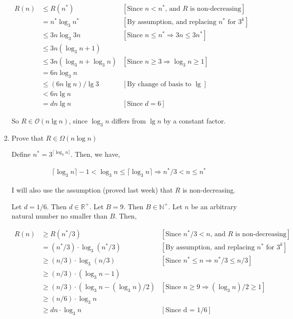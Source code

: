 \documentclass[12pt]{article}
\begin{document}
\begin{mdframed}
\begin{enumerate}[1.]
        \begin{mdframed}
        \begin{align}
        R(n) &\leq R(n^*)  & [\text{Since $n < n^*$, and $R$ is non-decreasing}]\\
        &= n^* \log_3 n^* & [\text{By assumption, and replacing $n^*$ for $3^k$}]\\
        &\leq 3n \log_3 3n  & [\text{Since $n \leq n^* \Rightarrow 3n \leq 3n^*$}]\\
        &\leq 3n(\log_3 n + 1)\\
        &\leq 3n(\log_3 n + \log_3 n) & [\text{Since $n \geq 3 \Rightarrow \log_3 n \geq 1$}]\\
        &= 6n \log_3 n\\
        &\leq (6n \lg n)/\lg 3 & [\text{By change of basis to $\lg$}]\\
        &< 6n \lg n\\
        &= dn \lg n & [\text{Since $d = 6$}]
        \end{align}

        \end{mdframed}

        So $R \in \mathcal{O}(n \lg n)$, since $\log_3 n$ differs from $\lg n$ by a constant factor.

        \item Prove that $R \in \Omega(n \log n)$

        \begin{mdframed}

        Define $n^* = 3^{\lceil \log_3 n \rceil}$. Then, we have,

        \begin{align}
            \lceil \log_3 n \rceil - 1 < \log_3 n \leq \lceil \log_3 n \rceil \Rightarrow n^*/3 < n \leq n^*
        \end{align}

        I will also use the assumption (proved last week) that $R$ is non-decreasing.

        \bigskip

        Let $d = 1/6$. Then $d \in \mathbb{R}^+$. Let $B = 9$. Then $B \in \mathbb{N}^+$. Let
        $n$ be an arbitrary natural number no smaller than $B$. Then,

        \begin{align}
        R(n) &\geq R(n^*/3) & [\text{Since $n^*/3 < n$, and $R$ is non-decreasing}]\\
        &= (n^*/3) \cdot \log_3 (n^*/3) & [\text{By assumption, and replacing $n^*$ for $3^k$}]\\
        &\geq (n/3) \cdot \log_3 (n/3) & [\text{Since $n^* \leq n \Rightarrow n^*/3 \leq n/3$}]\\
        &\geq (n/3) \cdot (\log_3 n - 1)\\
        &\geq (n/3) \cdot (\log_3 n - (\log_3 n)/2) & [\text{Since $n \geq 9 \Rightarrow (\log_3 n)/2 \geq 1$}]\\
        &\geq (n/6) \cdot \log_3 n\\
        &\geq dn \cdot \log_3 n & [\text{Since d = 1/6}]
        \end{align}


\end{mdframed}
\end{enumerate}
\end{mdframed}
\end{document}

